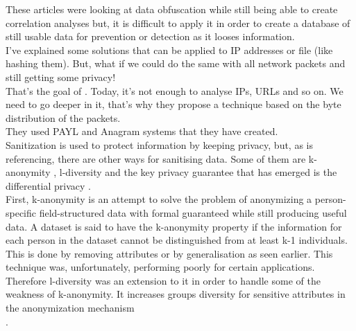 \documentclass{eplmastersthesis}
\begin{document}
These articles were looking at data obfuscation while still being able to create correlation analyses but, it is difficult to apply it in order to create a database of still usable data for prevention or detection as it looses information.
\\

I've explained some solutions that can be applied to IP addresses or file (like hashing them). But, what if we could do the same with all network packets and still getting some privacy!\\
That's the goal of \cite{parekh2006privacy}. Today, it's not enough to analyse IPs, URLs and so on. We need to go deeper in it, that's why they propose a technique based on the byte distribution of the packets.\\
They used PAYL and Anagram \cite{wang2006network} systems that they have created.\\

Sanitization is used to protect information by keeping privacy, but, as \cite{mohaisen2017rethinking} is referencing, there are other ways for sanitising data. Some of them are k-anonymity \cite{sweeney2002k}, l-diversity \cite{machanavajjhala2007diversity} and the key privacy guarantee that has emerged is the differential privacy \cite{dwork2008differential}.\\
First, k-anonymity is an attempt to solve the problem of anonymizing a person-specific field-structured data with formal guaranteed while still producing useful data. A dataset is said to have the k-anonymity property if the information for each person in the dataset cannot be distinguished from at least k-1 individuals. This is done by removing attributes or by generalisation as seen earlier. This technique was, unfortunately, performing poorly for certain applications. Therefore l-diversity was an extension to it in order to handle some of the weakness of k-anonymity. It increases groups diversity for sensitive attributes in the anonymization mechanism\\.
\end{document}
